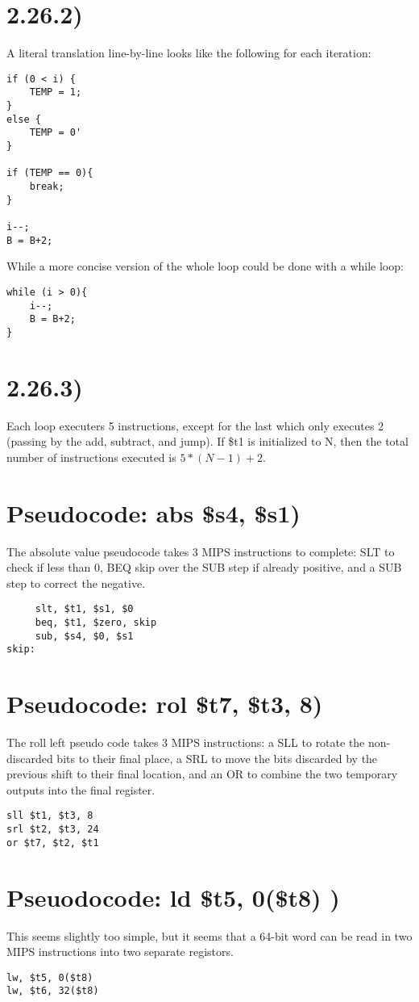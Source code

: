 \documentclass[a4paper,11pt]{article}
\begin{document}
\section*{2.26.2)}
A literal translation line-by-line looks like the following for each iteration:
\begin{verbatim}
if (0 < i) {
    TEMP = 1;
}
else {
    TEMP = 0'
}

if (TEMP == 0){
    break;
}

i--;
B = B+2;
\end{verbatim}

\noindent While a more concise version of the whole loop could be done with a while loop:
\begin{verbatim}
while (i > 0){
    i--;
    B = B+2;
}
\end{verbatim}

\section*{2.26.3)}
Each loop executers 5 instructions, except for the last which only executes 2 (passing by the add, subtract, and jump).  If \$t1 is initialized to N, then the total number of instructions executed is $5*(N-1) + 2$.

\section*{Pseudocode: abs  \$s4, \$s1)}
The absolute value pseudocode takes 3 MIPS instructions to complete:  SLT to check if less than 0, BEQ skip over 
the SUB step if already positive, and a SUB step to correct the negative.
\begin{verbatim}
     slt, $t1, $s1, $0
     beq, $t1, $zero, skip
     sub, $s4, $0, $s1
skip:
\end{verbatim}

\section*{Pseudocode: rol  \$t7, \$t3, 8)}
The roll left pseudo code takes 3 MIPS instructions: a SLL to rotate the non-discarded bits to their final place, a SRL to
move the bits discarded by the previous shift to their final location, and an OR to combine the two temporary outputs
into the final register.
\begin{verbatim}
sll $t1, $t3, 8   
srl $t2, $t3, 24
or $t7, $t2, $t1

\end{verbatim}

\section*{Pseuodocode: ld  \$t5, 0(\$t8) )}
This seems slightly too simple, but it seems that a 64-bit word can be read in two MIPS instructions into two separate
registors. 
\begin{verbatim}
lw, $t5, 0($t8)
lw, $t6, 32($t8)
\end{verbatim}

\end{document}
